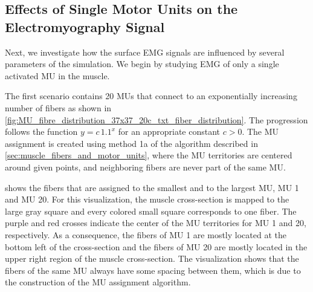 \subsection{Effects of Single Motor Units on the Electromyography Signal}\label{sec:simfiber_mu}

Next, we investigate how the surface EMG signals are influenced by several parameters of the simulation. We begin by studying EMG of only a single activated MU in the muscle.

The first scenario contains 20 MUs that connect to an exponentially increasing number of fibers as shown in \cref{fig:MU_fibre_distribution_37x37_20c_txt_fiber_distribution}. The progression follows the function $y=c\,1.1^x$ for an appropriate constant $c>0$.
The MU assignment is created using method 1a of the algorithm described in \cref{sec:muscle_fibers_and_motor_units}, where the MU territories are centered around given points, and neighboring fibers are never part of the same MU. 

 shows the fibers that are assigned to the smallest and to the largest MU, MU 1 and MU 20. For this visualization, the muscle cross-section is mapped to the large gray square and every colored small square corresponds to one fiber. The purple and red crosses indicate the center of the MU territories for MU 1 and 20, respectively. As a consequence, the fibers of MU 1 are mostly located at the bottom left of the cross-section and the fibers of MU 20 are mostly located in the upper right region of the muscle cross-section.
The visualization shows that the fibers of the same MU always have some spacing between them, which is due to the construction of the MU assignment algorithm.

